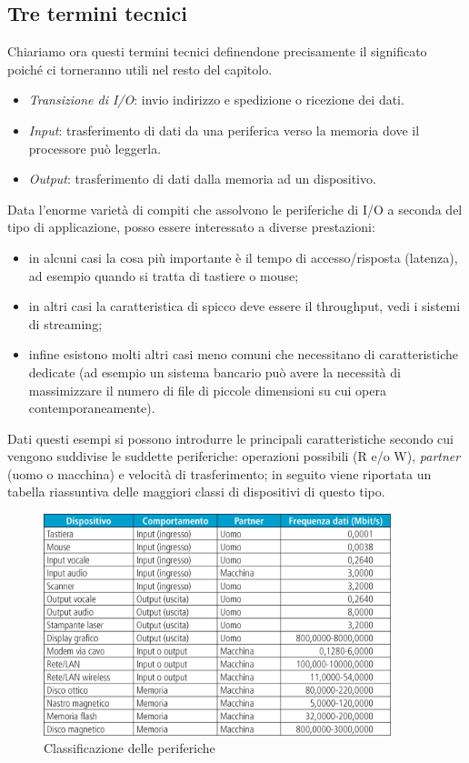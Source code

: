 \documentclass[class=book, crop=false, oneside]{standalone}
\begin{document}
\subsection*{Tre termini tecnici}
Chiariamo ora questi termini tecnici definendone precisamente il significato poiché ci torneranno utili nel resto del capitolo.
\begin{itemize}
	\item \emph{Transizione di I/O}: invio indirizzo e spedizione o ricezione dei dati.
	\item \emph{Input}: trasferimento di dati da una periferica verso la memoria dove il processore può leggerla.
	\item \emph{Output}: trasferimento di dati dalla memoria ad un dispositivo.
\end{itemize}
Data l'enorme varietà di compiti che assolvono le periferiche di I/O a  seconda del tipo di applicazione, posso essere interessato a diverse prestazioni:
\begin{itemize}
	\item in alcuni casi la cosa più importante è il tempo di accesso/risposta (latenza), ad esempio quando si tratta di tastiere o mouse;
	\item in altri casi la caratteristica di spicco deve essere il throughput, vedi i sistemi di streaming;
	\item infine esistono molti altri casi meno comuni che necessitano di caratteristiche dedicate (ad esempio un sistema bancario può avere la necessità di massimizzare il numero di file di piccole dimensioni su cui opera contemporaneamente).
\end{itemize}
Dati questi esempi si possono introdurre le principali caratteristiche secondo cui vengono suddivise le suddette periferiche: operazioni possibili (R e/o W), \emph{partner} (uomo o macchina) e velocità di trasferimento; in seguito viene riportata un tabella riassuntiva delle maggiori classi di dispositivi di questo tipo.

\begin{figure}[!h]
	\centering
	\includegraphics[width=0.9\textwidth,keepaspectratio]{classificazione-periferiche}
	\caption{Classificazione delle periferiche}
\end{figure}
\end{document}
